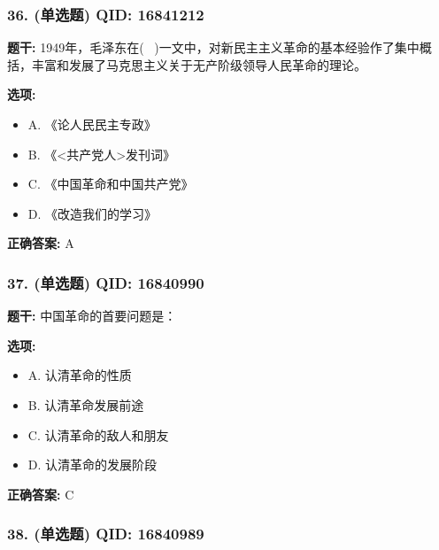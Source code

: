 \documentclass[12pt,UTF8]{ctexart}
\begin{document}
\subsubsection*{36. (单选题) \small QID: 16841212}

\textbf{题干:}
1949年，毛泽东在(  )一文中，对新民主主义革命的基本经验作了集中概括，丰富和发展了马克思主义关于无产阶级领导人民革命的理论。

\textbf{选项:}
\begin{itemize}[leftmargin=*]

  \item A. 《论人民民主专政》

  \item B. 《<共产党人>发刊词》

  \item C. 《中国革命和中国共产党》

  \item D. 《改造我们的学习》

\end{itemize}

\textbf{正确答案:}
A

\vspace{0.3em}\hrulefill\vspace{0.7em}

\subsubsection*{37. (单选题) \small QID: 16840990}

\textbf{题干:}
中国革命的首要问题是：

\textbf{选项:}
\begin{itemize}[leftmargin=*]

  \item A. 认清革命的性质

  \item B. 认清革命发展前途

  \item C. 认清革命的敌人和朋友

  \item D. 认清革命的发展阶段

\end{itemize}

\textbf{正确答案:}
C

\vspace{0.3em}\hrulefill\vspace{0.7em}

\subsubsection*{38. (单选题) \small QID: 16840989}
\end{document}
